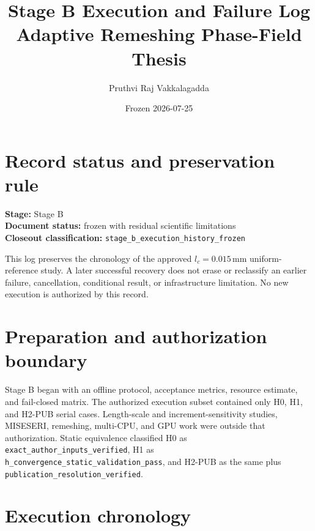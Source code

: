 \documentclass[11pt,a4paper]{article}
\title{Stage B Execution and Failure Log\\Adaptive Remeshing Phase-Field Thesis}
\author{Pruthvi Raj Vakkalagadda}
\date{Frozen 2026-07-25}
\begin{document}
\maketitle

\section*{Record status and preservation rule}

\noindent\textbf{Stage:} Stage B\\
\textbf{Document status:} frozen with residual scientific limitations\\
\textbf{Closeout classification:}
\texttt{stage\_b\_execution\_history\_frozen}

\medskip

This log preserves the chronology of the approved \(l_c=0.015\,\mathrm{mm}\)
uniform-reference study.  A later successful recovery does not erase or
reclassify an earlier failure, cancellation, conditional result, or
infrastructure limitation.  No new execution is authorized by this record.

\section{Preparation and authorization boundary}

Stage B began with an offline protocol, acceptance metrics, resource estimate,
and fail-closed matrix.  The authorized execution subset contained only H0,
H1, and H2-PUB serial cases.  Length-scale and increment-sensitivity studies,
MISESERI, remeshing, multi-CPU, and GPU work were outside that authorization.
Static equivalence classified H0 as
\texttt{exact\_author\_inputs\_verified}, H1 as
\texttt{h\_convergence\_static\_validation\_pass}, and H2-PUB as the same
plus \texttt{publication\_resolution\_verified}.

\section{Execution chronology}
\end{document}
